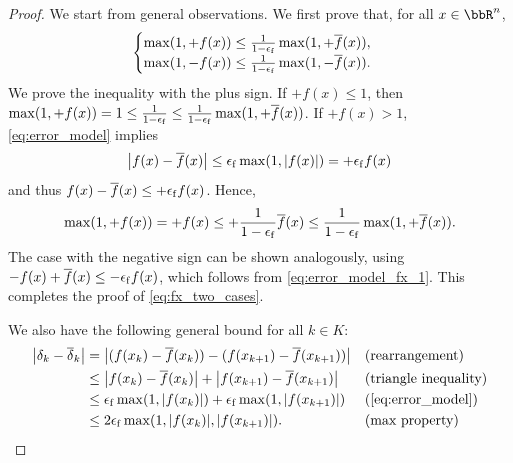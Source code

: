 \documentclass[journal]{subfiles}
\begin{document}
\begin{proof}
    We start from general observations.
    We first prove that, for all $x \in \bbR^n$,
    \begin{equation}\label{eq:fx_two_cases}
        \begin{cases}
            \max(1,+f(x))  \le \frac{1}{1-\epsilon_\mathrm{f}} \max(1,+\overline f(x)), \\
            \max(1,-f(x)) \le \frac{1}{1-\epsilon_\mathrm{f}} \max(1,-\overline f(x)).
        \end{cases}
    \end{equation}
    We prove the inequality with the plus sign.
    If $+f(x)\le 1$, then $\max(1,+f(x)) = 1 \leq \frac{1}{1-\epsilon_\mathrm{f}} \leq \frac{1}{1-\epsilon_\mathrm{f}} \max(1,+\overline f(x))$.
    If $+f(x) > 1$, \cref{eq:error_model} implies
    \begin{equation}\label{eq:error_model_fx_1}
        \abs{f(x)-\overline{f}(x)} \le \epsilon_\mathrm{f} \max(1,\abs{f(x)}) = +\epsilon_\mathrm{f} f(x)
    \end{equation}
    and thus $f(x) - \overline f(x) \leq +\epsilon_\mathrm{f} f(x)$. Hence,
    \begin{equation*}
        \max(1,+f(x)) = +f(x) \le +\frac{1}{1-\epsilon_\mathrm{f}} \overline f(x) \le \frac{1}{1-\epsilon_\mathrm{f}} \max(1,+\overline f(x)).
    \end{equation*}
    The case with the negative sign can be shown analogously, using $-f(x) + \overline f(x) \leq -\epsilon_\mathrm{f} f(x)$, which follows from \cref{eq:error_model_fx_1}. This completes the proof of \cref{eq:fx_two_cases}.

    We also have the following general bound for all $k \in K$:
    \begin{align}
        \abs{\delta_k-\overline{\delta}_k}
         & = \abs{(f(x_k)-\overline{f}(x_k)) - (f(x_{k+1})-\overline{f}(x_{k+1}))}      &  & (\text{rearrangement})                                \notag \\
         & \leq \abs{f(x_k)-\overline{f}(x_k)} + \abs{f(x_{k+1})-\overline{f}(x_{k+1})} &  & (\text{triangle inequality}) \notag                          \\
         & \le \feps\max(1,\abs{f(x_k)}) + \feps\max(1,\abs{f(x_{k+1})})                &  & (\text{\cref{eq:error_model}}) \notag                        \\
         & \le 2\feps \max(1,\abs{f(x_k)},\abs{f(x_{k+1})}).                            &  & (\text{max property}) \label{eq:delta_k_error_bound}
    \end{align}


\end{proof}
\end{document}
